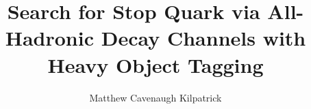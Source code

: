 \documentclass[12pt]{ruthesis}
\title{Search for Stop Quark via All-Hadronic Decay Channels with Heavy Object Tagging}
\author{Matthew Cavenaugh Kilpatrick}
\begin{document}
  \begin{frontmatter}
   \makecover
   \maketitle
   
   \tableofcontents
   \listoffigures
   \listoftables
%   
  \end{frontmatter}






%



\appendix

%
%
%
%



\end{document}
